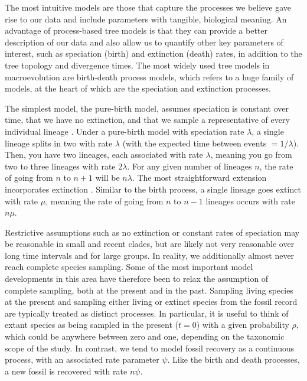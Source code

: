 The most intuitive models are those that capture the processes we believe gave rise to our data and include parameters with tangible, biological meaning.
An advantage of process-based tree models is that they can provide a better description of our data and also allow us to quantify other key parameters of interest, such as speciation (birth) and extinction (death) rates, in addition to the tree topology and divergence times.
The most widely used tree models in macroevolution are birth-death process models, which refers to a huge family of models, at the heart of which are the speciation and extinction processes. 

The simplest model, the pure-birth model, assumes speciation is constant over time, that we have no extinction, and that we sample a representative of every individual lineage \citep{Yule1925}.
Under a pure-birth model with speciation rate $\lambda$, a single lineage splits in two with rate $\lambda$ (with the expected time between events $=1/\lambda$). Then, you have two lineages, each associated with rate $\lambda$, meaning you go from two to three lineages with rate 2$\lambda$. For any given number of lineages $n$, the rate of going from $n$ to $n+1$ will be $n\lambda$.
The most straightforward extension incorporates  extinction \citep{Kendall1948}.
Similar to the birth process, a single lineage goes extinct with rate $\mu$, meaning the rate of going from $n$ to $n-1$ lineages occurs with rate $n\mu$.

Restrictive assumptions such as no extinction or constant rates of speciation may be reasonable in small and recent clades, but are likely not very reasonable over long time intervals and for large groups.
In reality, we additionally almost never reach complete species sampling.
Some of the most important model developments in this area have therefore been to relax the assumption of complete sampling, both at the present and in the past.
Sampling living species at the present and sampling either living or extinct species from the fossil record are typically treated as distinct processes.
In particular, it is useful to think of extant species as being sampled in the present ($t=0$) with a given probability $\rho$, which could be anywhere between zero and one, depending on the taxonomic scope of the study.
In contrast, we tend to model fossil recovery as a continuous process, with an associated rate parameter $\psi$. Like the birth and death processes, a new fossil is recovered with rate $n\psi$.

